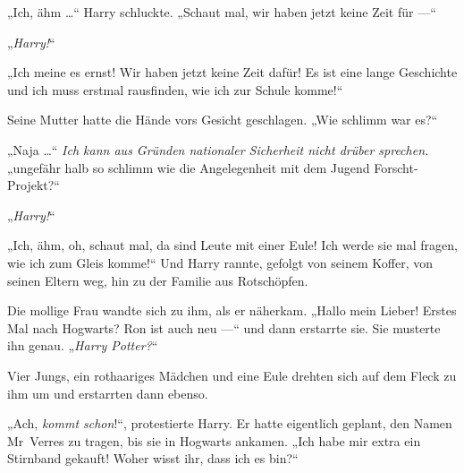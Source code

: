 „Ich, ähm …“ Harry schluckte.
„Schaut mal, wir haben jetzt keine Zeit für —“

„\emph{Harry!}“

„Ich meine es ernst! Wir haben jetzt keine Zeit dafür! Es ist eine lange Geschichte und ich muss erstmal rausfinden, wie ich zur Schule komme!“

Seine Mutter hatte die Hände vors Gesicht geschlagen.
„Wie schlimm war es?“

„Naja …“ \emph{Ich kann aus Gründen nationaler Sicherheit nicht drüber sprechen.} „ungefähr halb so schlimm wie die Angelegenheit mit dem Jugend Forscht-Projekt?“

„\emph{Harry!}“

„Ich, ähm, oh, schaut mal, da sind Leute mit einer Eule! Ich werde sie mal fragen, wie ich zum Gleis komme!“ Und Harry rannte, gefolgt von seinem Koffer, von seinen Eltern weg, hin zu der Familie aus Rotschöpfen.

Die mollige Frau wandte sich zu ihm, als er näherkam.
„Hallo mein Lieber! Erstes Mal nach Hogwarts? Ron ist auch neu —“ und dann erstarrte sie. Sie musterte ihn genau.
„\emph{Harry Potter?}“

Vier Jungs, ein rothaariges Mädchen und eine Eule drehten sich auf dem Fleck zu ihm um und erstarrten dann ebenso.

„Ach, \emph{kommt schon}!“, protestierte Harry. Er hatte eigentlich geplant, den Namen Mr~Verres zu tragen, bis sie in Hogwarts ankamen.
„Ich habe mir extra ein Stirnband gekauft! Woher wisst ihr, dass ich es bin?“

